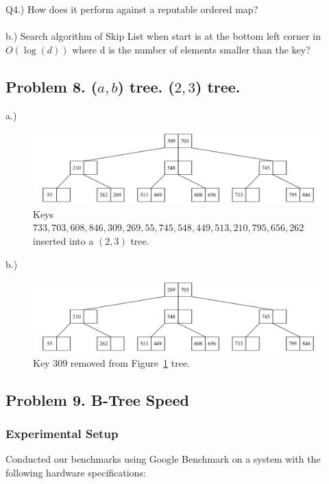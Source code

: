 \documentclass[12pt]{article}
\begin{document}
Q4.) How does it perform against a reputable ordered map?
\\\\
	
b.) Search algorithm of Skip List when start is at the bottom left corner in $O(\log(d))$ where d is the number of elements smaller than the key?
	

	
	\vspace{2in} %
	
	
	
	\subsection*{Problem 8. ($a,b$) tree. ($2, 3$) tree.}

	a.)	
	\begin{figure}[H] 
		\centering
		\includegraphics[width=0.9\linewidth]{Q8_a.drawio}
		\caption{Keys $733, 703, 608, 846, 309, 269, 55, 745, 548, 449, 513, 210, 795, 656, 262$ inserted into a $(2, 3)$ tree.}
		\label{fig:q8a}
	\end{figure}
	

	
	b.) 
	\begin{figure}[H] 
		\centering
		\includegraphics[width=0.9\linewidth]{Q8_b.drawio}
		\caption{Key 309 removed from Figure~\ref{fig:q8a} tree.}
		\label{fig:q8b}
	\end{figure}
	
	
\vspace{2in} %


\subsection*{Problem 9. B-Tree Speed}

\subsubsection*{Experimental Setup}
Conducted our benchmarks using Google Benchmark on a system with the following hardware specifications:
\end{document}
